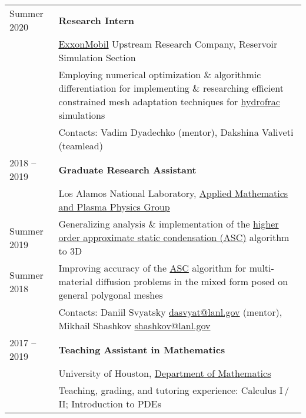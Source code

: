 \documentclass[a4paper,12pt]{article}
\begin{document}
\begin{longtable}{ l >{\raggedright\arraybackslash}p{15cm} }
		Summer 2020
			& \textbf{Research Intern}\vspace{1mm}\\
			& \href{https://corporate.exxonmobil.com/}{ExxonMobil} Upstream Research Company, Reservoir Simulation Section\vspace{1mm}\\
			& Employing numerical optimization \& algorithmic differentiation for implementing \& researching efficient constrained mesh adaptation techniques for \href{https://en.wikipedia.org/wiki/Hydraulic_fracturing}{hydrofrac} simulations\vspace{1mm}\\
			& Contacts: Vadim Dyadechko (mentor), Dakshina Valiveti (teamlead) \vspace{3mm}\\			
		2018 -- 2019
			& \textbf{Graduate Research Assistant}\vspace{1mm}\\
			& Los Alamos National Laboratory, \href{https://www.lanl.gov/org/ddste/aldsc/theoretical/applied-mathematics-plasma-physics/index.php}{Applied Mathematics and Plasma Physics Group}\vspace{1mm}\\
		Summer 2019
			& Generalizing analysis \& implementation of the \href{https://www.researchgate.net/publication/330912268_A_higher_order_approximate_static_condensation_method_for_multi-material_diffusion_problems}{higher order approximate static condensation (ASC)} algorithm to 3D\vspace{1mm}\\
		Summer 2018
			& Improving accuracy of the \href{https://www.researchgate.net/publication/318300724_Approximate_static_condensation_algorithm_for_solving_multi-material_diffusion_problems_on_meshes_non-aligned_with_material_interfaces}{ASC} algorithm for multi-material diffusion problems in the mixed form posed on general polygonal meshes\vspace{1mm}\\
			& Contacts: Daniil Svyatsky \href{mailto:dasvyat@lanl.gov}{dasvyat@lanl.gov} (mentor), Mikhail Shashkov \href{mailto:shashkov@lanl.gov}{shashkov@lanl.gov}\vspace{3mm}\\
		2017 -- 2019
			& \textbf{Teaching Assistant in Mathematics}\vspace{1mm}\\
			& University of Houston, \href{http://www.uh.edu/nsm/math/}{Department of Mathematics}\vspace{1mm}\\
			& Teaching, grading, and tutoring experience: Calculus I\,/\,II; Introduction to PDEs
	\end{longtable}
\end{document}

